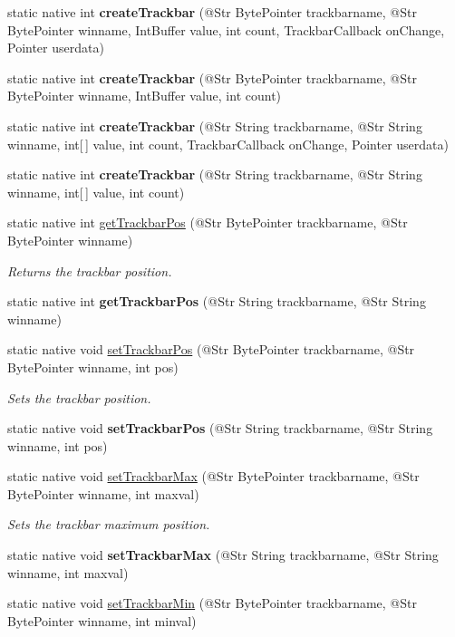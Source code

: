 \begin{DoxyCompactItemize}
static native int {\bfseries create\+Trackbar} (@Str Byte\+Pointer trackbarname, @Str Byte\+Pointer winname, Int\+Buffer value, int count, Trackbar\+Callback on\+Change, Pointer userdata)
\item 
static native int {\bfseries create\+Trackbar} (@Str Byte\+Pointer trackbarname, @Str Byte\+Pointer winname, Int\+Buffer value, int count)
\item 
static native int {\bfseries create\+Trackbar} (@Str String trackbarname, @Str String winname, int\mbox{[}$\,$\mbox{]} value, int count, Trackbar\+Callback on\+Change, Pointer userdata)
\item 
static native int {\bfseries create\+Trackbar} (@Str String trackbarname, @Str String winname, int\mbox{[}$\,$\mbox{]} value, int count)
\item 
static native int \hyperlink{group__highgui_gad91f649b98c33cbfdbf3c995935facdc}{get\+Trackbar\+Pos} (@Str Byte\+Pointer trackbarname, @Str Byte\+Pointer winname)
\begin{DoxyCompactList}\small\item\em Returns the trackbar position. \end{DoxyCompactList}\item 
static native int {\bfseries get\+Trackbar\+Pos} (@Str String trackbarname, @Str String winname)
\item 
static native void \hyperlink{group__highgui_ga53b09172763cf63873f5ac01fef0154d}{set\+Trackbar\+Pos} (@Str Byte\+Pointer trackbarname, @Str Byte\+Pointer winname, int pos)
\begin{DoxyCompactList}\small\item\em Sets the trackbar position. \end{DoxyCompactList}\item 
static native void {\bfseries set\+Trackbar\+Pos} (@Str String trackbarname, @Str String winname, int pos)
\item 
static native void \hyperlink{group__highgui_ga7f8973f0842fd2c01aad396250da751a}{set\+Trackbar\+Max} (@Str Byte\+Pointer trackbarname, @Str Byte\+Pointer winname, int maxval)
\begin{DoxyCompactList}\small\item\em Sets the trackbar maximum position. \end{DoxyCompactList}\item 
static native void {\bfseries set\+Trackbar\+Max} (@Str String trackbarname, @Str String winname, int maxval)
\item 
static native void \hyperlink{group__highgui_gaf177a5a7400badc50be0ce11d404c74f}{set\+Trackbar\+Min} (@Str Byte\+Pointer trackbarname, @Str Byte\+Pointer winname, int minval)

\end{DoxyCompactItemize}
